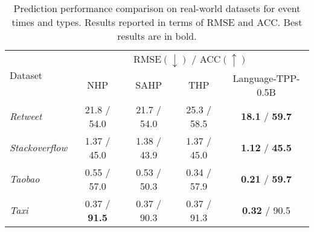\begin{table*}[!tbp]
\centering
\caption{Prediction performance comparison on real-world datasets for event times and types. Results reported in terms of RMSE and ACC. Best results are in bold.}
\label{tab:main_results}
\begin{tabular}{lcccc}
\toprule
\multirow{2}{*}{Dataset} & \multicolumn{4}{c}{RMSE$(\downarrow)$ / ACC$(\uparrow)$} \\
\cmidrule{2-5}
& NHP & SAHP & THP & Language-TPP-0.5B \\
\midrule
\textit{Retweet} & 21.8 / 54.0 & 21.7 / 54.0 & 25.3 / 58.5  &  \textbf{18.1} / \textbf{59.7} \\
\textit{Stackoverflow} & 1.37 / 45.0  & 1.38 / 43.9 & 1.37 / 45.0  & \textbf{1.12} / \textbf{45.5} \\
\textit{Taobao} & 0.55 / 57.0 & 0.53 / 50.3  & 0.34 / 57.9  & \textbf{0.21} / \textbf{59.7} \\
\textit{Taxi} & 0.37 / \textbf{91.5} &  0.37 / 90.3 & 0.37 / 91.3 & \textbf{0.32} / 90.5  \\
\bottomrule
\end{tabular}
\end{table*}


